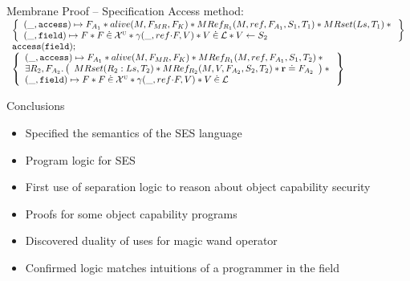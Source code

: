\documentclass[xcolor=x11names,compress]{beamer}
\renewcommand{\(}{\begin{columns}}
\renewcommand{\)}{\end{columns}}
\newcommand{\<}[1]{\begin{column}{#1}}
\renewcommand{\>}{\end{column}}
\begin{document}
\begin{frame}{Membrane Proof -- Specification}
  Access method:\\[0.2cm]
  \begin{adjustbox}{width=\textwidth,keepaspectratio}
$
  \begin{array}{l}
    \logic{
      (\_,\js{access}) \pointsto F_{A_1} \sep
      alive(M, F_{MR}, F_K) \sep
      MRef_{R_1}(M,ref,F_{A_1},S_1,T_1) \sep
      MRset(Ls,T_1) \sep {} \\

      (\_, \js{field}) \pointsto F \sep F \dotin \uvars \sep
      \getValue(\_, \fld{ref}{F}, V) \sep
      V \dotin \loc \sep
      V \bp S_2
    } \\
    \js{access(field);} \\
    \logic{
      (\_, \js{access}) \pointsto F_{A_1} \sep
      alive(M, F_{MR}, F_K) \sep
      MRef_{R_1}(M,ref,F_{A_1},S_1,T_2) \sep {} \\
      \exists R_2, F_{A_2} \st \args{
        MRset(R_2:Ls,T_2) \sep
        MRef_{R_2}(M,V,F_{A_2},S_2,T_2) \sep
        \rv \doteq F_{A_2}
      } \sep {} \\
      (\_, \js{field}) \pointsto F \sep F \dotin \uvars \sep
      \getValue(\_, \fld{ref}{F}, V) \sep
      V \dotin \loc
    }
  \end{array}
$
\end{adjustbox}
\end{frame}

\begin{frame}{Conclusions}
\begin{itemize}
  \item Specified the semantics of the SES language
  \item Program logic for SES
  \item First use of separation logic to reason about object capability security
  \item Proofs for some object capability programs
  \item Discovered duality of uses for magic wand operator
  \item Confirmed logic matches intuitions of a programmer in the field
\end{itemize}
\end{frame}
\end{document}
